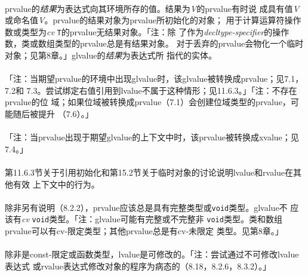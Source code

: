 \paragraph{}
prvalue的\textit{结果}为表达式向其环境所存的值。结果为\textit{V}的prvalue有时说
成具有值\textit{V}或命名值\textit{V}。prvalue的结果对象为prvalue所初始化的对象；
用于计算运算符操作数或类型为\textit{cv} \texttt{T}的prvalue无结果对象。「注：除
了作为\textit{decltype-specifier}的操作数，类或数组类型的prvalue总是有结果对象。
对于丢弃的prvalue会物化一个临时对象；见第8章。」glvalue的\textit{结果}为表达式所
指代的实体。

\paragraph{}
「注：当期望prvalue的环境中出现glvalue时，该glvalue被转换成prvalue；见7.1，7.2和
7.3。尝试绑定右值引用到lvalue不属于这种情形；见11.6.3。」「注：不存在prvalue的位
域；如果位域被转换成prvalue（7.1）会创建位域类型的prvalue，可能随后被提升
（7.6）。」

\paragraph{}
「注：当prvalue出现于期望glvalue的上下文中时，该prvalue被转换成xvalue；见7.4。」

\paragraph{}
第11.6.3节关于引用初始化和第15.2节关于临时对象的讨论说明lvalue和rvalue在其他有效
上下文中的行为。

\paragraph{}
除非另有说明（8.2.2），prvalue应该总是具有完整类型或\texttt{void}类型。glvalue不
应该有\textit{cv} \texttt{void}类型。「注：glvalue可能有完整或不完整非
\texttt{void}类型。类和数组prvalue可以有cv-限定类型；其他prvalue总是有cv-未限定
类型。见第8章。」

\paragraph{}
除非是const-限定或函数类型，lvalue是可修改的。「注：尝试通过不可修改lvalue表达式
或rvalue表达式修改对象的程序为病态的（8.18，8.2.6，8.3.2）。」


